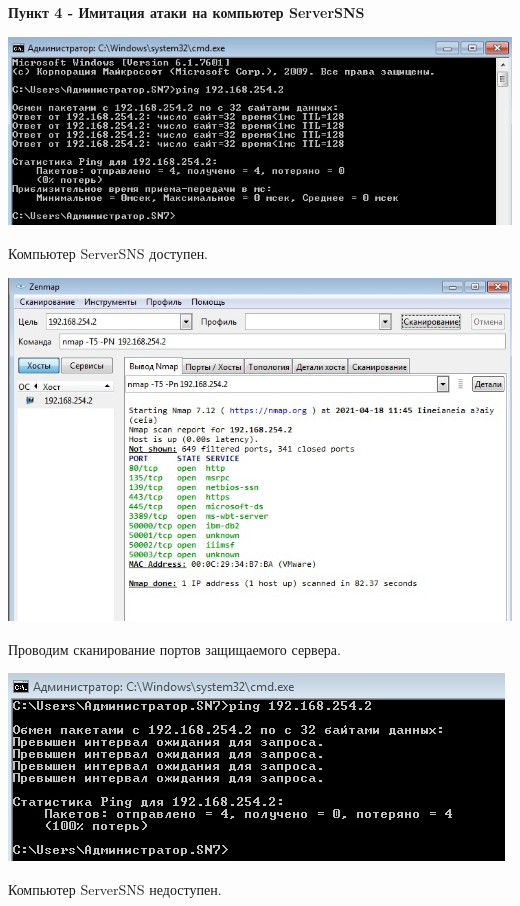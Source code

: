 \documentclass[a4paper,14pt]{extarticle}
\begin{document}
    \textbf{Пункт 4 - Имитация атаки на компьютер ServerSNS}
    \begin{center}
        \includegraphics[scale=0.6]{pics/4_1.jpg}
        
        Компьютер ServerSNS доступен.

        \includegraphics[scale=0.6]{pics/4_2.jpg}

        Проводим сканирование портов защищаемого сервера.

        \includegraphics[scale=0.7]{pics/4_3.jpg}

        Компьютер ServerSNS недоступен.

    \end{center}
\end{document}
